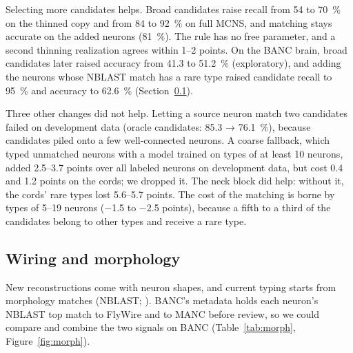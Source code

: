 \documentclass[11pt,a4paper]{article}
\begin{document}
Selecting more candidates helps. Broad candidates raise recall from 54 to 70~\% on the thinned copy and from 84 to 92~\% on full MCNS, and matching stays accurate on the added neurons (81~\%). The rule has no free parameter, and a second thinning realization agrees within 1–2 points. On the BANC brain, broad candidates later raised accuracy from 41.3 to 51.2~\% (exploratory), and adding the neurons whose NBLAST match has a rare type raised candidate recall to 95~\% and accuracy to 62.6~\% (Section~\ref{sec:res-morph}).

Three other changes did not help. Letting a source neuron match two candidates failed on development data (oracle candidates: 85.3 → 76.1~\%), because candidates piled onto a few well-connected neurons. A coarse fallback, which typed unmatched neurons with a model trained on types of at least 10 neurons, added 2.5–3.7 points over all labeled neurons on development data, but cost 0.4 and 1.2 points on the cords; we dropped it. The neck block did help: without it, the cords' rare types lost 5.6–5.7 points. The cost of the matching is borne by types of 5–19 neurons (−1.5 to −2.5 points), because a fifth to a third of the candidates belong to other types and receive a rare type.

\subsection{Wiring and morphology}\label{sec:res-morph}

New reconstructions come with neuron shapes, and current typing starts from morphology matches (NBLAST; \citealp{costa2016}). BANC's metadata holds each neuron's NBLAST top match to FlyWire and to MANC before review, so we could compare and combine the two signals on BANC (Table~\ref{tab:morph}, Figure~\ref{fig:morph}).
\end{document}
